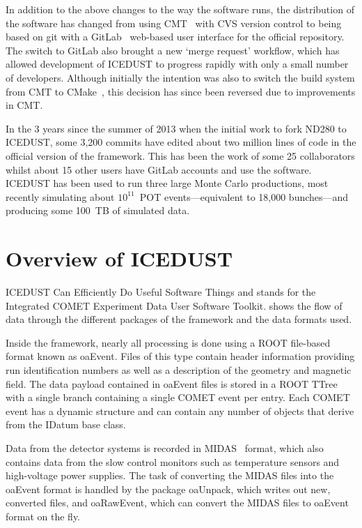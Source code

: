 In addition to the above changes to the way the software runs, the distribution of the software has changed from using CMT~\cite{cmt} with CVS version control to being based on git with a GitLab~\cite{GitLab} web-based user interface for the official repository.
The switch to GitLab also brought a new `merge request' workflow, which has allowed development of ICEDUST to progress rapidly with only a small number of developers.
Although initially the intention was also to switch the build system from CMT to CMake~\cite{cmake}, this decision has since been reversed due to improvements in CMT.

In the 3 years since the summer of 2013 when the initial work to fork ND280 to ICEDUST, some 3,200 commits have edited about two million lines of code in the official version of the framework.
This has been the work of some 25 collaborators whilst about 15 other users have GitLab accounts and use the software.
ICEDUST has been used to run three large Monte Carlo productions, most recently simulating about $10^{11}$~\ac{POT} events---equivalent to 18,000 \phaseI bunches---and producing some 100~TB of simulated data.

\section{Overview of ICEDUST}
ICEDUST Can Efficiently Do Useful Software Things and stands for the Integrated COMET Experiment Data User Software Toolkit.
 shows the flow of data through the different packages of the framework and the data formats used.

\FigICEDUSTOverview

Inside the framework, nearly all processing is done using a ROOT file-based format known as oaEvent.  
Files of this type contain header information providing run identification numbers as well as a description of the geometry and magnetic field.  
The data payload contained in oaEvent files is stored in a ROOT TTree with a single branch containing a single COMET event per entry.
Each COMET event has a dynamic structure and can contain any number of objects that derive from the IDatum base class.

Data from the detector systems is recorded in MIDAS~\cite{MIDAS} format, which also contains data from the slow control monitors such as temperature sensors and high-voltage power supplies.
The task of converting the MIDAS files into the oaEvent format is handled by the package oaUnpack, which writes out new, converted files, and oaRawEvent, which can convert the MIDAS files to oaEvent format on the fly.

